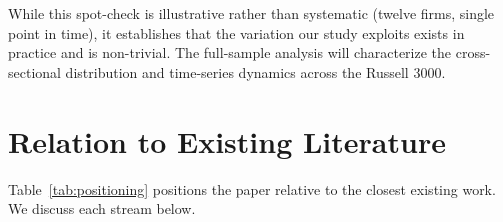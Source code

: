 \documentclass[12pt,a4paper]{article}
\begin{document}
\noindent While this spot-check is illustrative rather than systematic (twelve firms, single point in time), it establishes that the variation our study exploits exists in practice and is non-trivial. The full-sample analysis will characterize the cross-sectional distribution and time-series dynamics across the Russell 3000.

\section{Relation to Existing Literature}

Table~\ref{tab:positioning} positions the paper relative to the closest existing work. We discuss each stream below.
\end{document}
